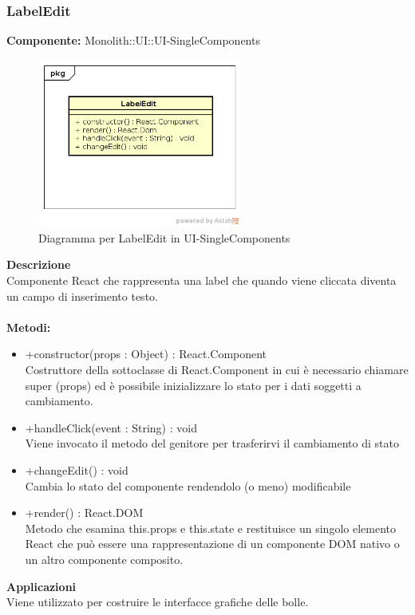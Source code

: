 \subsubsection{LabelEdit}
\textbf{Componente:}  Monolith::UI::UI-SingleComponents\\
   \FloatBarrier
   \begin{figure}[ht]
   \centering
   \includegraphics[width=0.6\textwidth]{img/single-LabelEdit}
   \caption{{Diagramma per LabelEdit in UI-SingleComponents}}
\end{figure}
\FloatBarrier
\textbf{Descrizione}\\
Componente React che rappresenta una label che quando viene cliccata diventa un campo di inserimento testo. \\\\
\textbf{Metodi:} \begin{itemize}\item +constructor(props : Object) : React.Component \\Costruttore della sottoclasse di React.Component in cui è necessario chiamare super (props) ed è possibile inizializzare lo stato per i dati soggetti a cambiamento.\item +handleClick(event : String) : void  \\Viene invocato il metodo del genitore per trasferirvi il cambiamento di stato\item +changeEdit() : void \\Cambia lo stato del componente rendendolo (o meno) modificabile\item +render() : React.DOM \\Metodo che esamina this.props e this.state e restituisce un singolo elemento React che può essere una rappresentazione di un componente DOM nativo o un altro componente composito.\end{itemize} 


\textbf{Applicazioni}\\
Viene utilizzato per costruire le interfacce grafiche delle bolle. 


